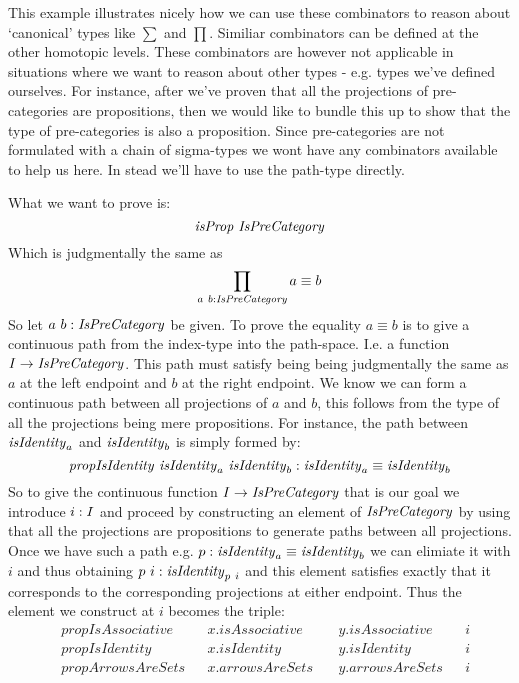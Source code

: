 This example illustrates nicely how we can use these combinators to reason about
`canonical' types like $\sum$ and $\prod$. Similiar combinators can be defined
at the other homotopic levels. These combinators are however not applicable in
situations where we want to reason about other types - e.g. types we've defined
ourselves. For instance, after we've proven that all the projections of
pre-categories are propositions, then we would like to bundle this up to show
that the type of pre-categories is also a proposition. Since pre-categories are
not formulated with a chain of sigma-types we wont have any combinators
available to help us here. In stead we'll have to use the path-type directly.

What we want to prove is:
%
$$
\isProp\ \IsPreCategory
$$
%
Which is judgmentally the same as
%
$$
\prod_{a\ b \mathrel{:} \mathit{IsPreCategory}} a \equiv b
$$
%
So let $a\ b \mathrel{:} \mathit{IsPreCategory}$ be given. To prove the equality $a \equiv b$ is
to give a continuous path from the index-type into the path-space. I.e. a
function $I \to \mathit{IsPreCategory}$. This path must satisfy being being judgmentally
the same as $a$ at the left endpoint and $b$ at the right endpoint. We know we
can form a continuous path between all projections of $a$ and $b$, this follows
from the type of all the projections being mere propositions. For instance, the
path between $\mathit{isIdentity}_a$ and $\mathit{isIdentity}_b$ is simply formed by:
%
$$
\mathit{propIsIdentity}\ \mathit{isIdentity}_a\ \mathit{isIdentity}_b \mathrel{:} \mathit{isIdentity}_a \equiv \mathit{isIdentity}_b
$$
%
So to give the continuous function $I \to \mathit{IsPreCategory}$ that is our goal we
introduce $i \mathrel{:} I$ and proceed by constructing an element of $\mathit{IsPreCategory}$
by using that all the projections are propositions to generate paths between all
projections. Once we have such a path e.g. $p \mathrel{:} \mathit{isIdentity}_a \equiv
\mathit{isIdentity}_b$ we can elimiate it with $i$ and thus obtaining $p\ i \mathrel{:}
\mathit{isIdentity}_{p\ i}$ and this element satisfies exactly that it corresponds to
the corresponding projections at either endpoint. Thus the element we construct
at $i$ becomes the triple:
%
\begin{equation}
\begin{alignat}{4}
  & \mathit{propIsAssociative} && x.\mathit{isAssociative}\
       && y.\mathit{isAssociative} && i  \\
  & \mathit{propIsIdentity}    && x.\mathit{isIdentity}\
       && y.\mathit{isIdentity}    && i  \\
  & \mathit{propArrowsAreSets} && x.\mathit{arrowsAreSets}\
       && y.\mathit{arrowsAreSets} && i
\end{alignat}
\end{equation}
